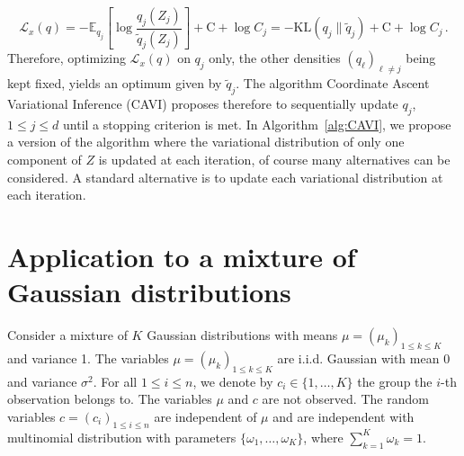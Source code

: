 \documentclass[english,graybox,envcountchap,envcountsame,sectrefs,shortlabels]{svmono}
\theoremstyle{style}
\begin{document}
$$
\mathcal{L}_x(q) = -\mathbb{E}_{q_j}\left[\log \frac{q_j(Z_j)}{\tilde q_j(Z_j) }\right]  + \mathrm{C} + \log C_j = -\mathrm{KL}(q_j\|\tilde q_j)  + \mathrm{C} + \log C_j\,.
$$
Therefore, optimizing  $\mathcal{L}_x(q) $ on $q_j$ only, the other densities $(q_\ell)_{\ell\neq j}$ being kept fixed, yields an optimum given by $\tilde q_j$.
The algorithm Coordinate Ascent Variational Inference (CAVI) proposes therefore to sequentially update  $q_j$, $1\leq j \leq d$ until a stopping criterion is met. In Algorithm~\ref{alg:CAVI}, we propose a version of the algorithm where the variational distribution of only one component of $Z$ is updated at each iteration, of course many alternatives can be considered. A standard alternative is to update each variational distribution at each iteration.

\begin{algorithm}[H] \label{alg:CAVI}
\end{algorithm}

\section{Application to a mixture of Gaussian distributions}
Consider a mixture of $K$ Gaussian distributions with means $\mu = (\mu_k)_{1\leqslant k \leqslant K}$ and variance 1. The variables  $\mu = (\mu_k)_{1\leqslant k \leqslant K}$ are  i.i.d. Gaussian with mean 0 and variance $\sigma^2$. For all $1\leq i\leq n$, we denote by $c_i\in\{1, \ldots, K\}$ the group the $i$-th observation belongs to. The variables $\mu$ and $c$ are not observed.  The random variables $c= (c_i)_{1\leq i\leq n}$ are independent of  $\mu$ and are independent with multinomial distribution with parameters $\{\omega_1,\ldots,\omega_K\}$, where $\sum_{k=1}^K\omega_k = 1$.  
\end{document}
